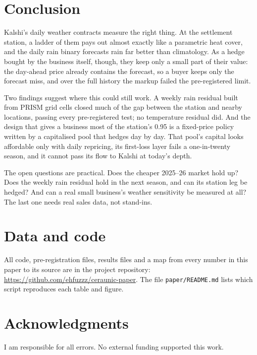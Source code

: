 \documentclass[11pt]{article}
\begin{document}
\section{Conclusion}

Kalshi's daily weather contracts measure the right thing. At the settlement station, a ladder of them pays out almost exactly like a parametric heat cover, and the daily rain binary forecasts rain far better than climatology. As a hedge bought by the business itself, though, they keep only a small part of their value: the day-ahead price already contains the forecast, so a buyer keeps only the forecast miss, and over the full history the markup failed the pre-registered limit.

Two findings suggest where this could still work. A weekly rain residual built from PRISM grid cells closed much of the gap between the station and nearby locations, passing every pre-registered test; no temperature residual did. And the design that gives a business most of the station's 0.95 is a fixed-price policy written by a capitalised pool that hedges day by day. That pool's capital looks affordable only with daily repricing, its first-loss layer fails a one-in-twenty season, and it cannot pass its flow to Kalshi at today's depth.

The open questions are practical. Does the cheaper 2025--26 market hold up? Does the weekly rain residual hold in the next season, and can its station leg be hedged? And can a real small business's weather sensitivity be measured at all? The last one needs real sales data, not stand-ins.

\section*{Data and code}

All code, pre-registration files, results files and a map from every number in this paper to its source are in the project repository: \url{https://github.com/ehfuzzz/ceraunic-paper}. The file \texttt{paper/README.md} lists which script reproduces each table and figure.

\section*{Acknowledgments}

I am responsible for all errors. No external funding supported this work.



\end{document}
